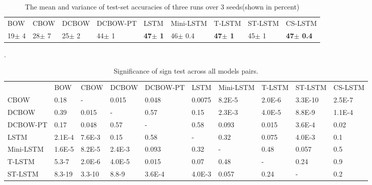 \begin{table*}[t]
    \centering
    \small
    \begin{tabular}{lllllllll}
    BOW  & CBOW & DCBOW & DCBOW-PT & LSTM & Mini-LSTM & T-LSTM & ST-LSTM &CS-LSTM \\
    19$\pm$ 4 & 28$\pm$ 7 & 25$\pm$ 2 & 44$\pm$ 1 & \textbf{47$\pm$ 1} & 46$\pm$ 0.4 & \textbf{47$\pm$ 1} & 45$\pm$ 1& \textbf{47$\pm$ 0.4}
    \end{tabular}
    \label{table: results-acc}
    \caption{The mean and variance of test-set accuracies of three runs over 3 seeds(shown in percent)}.
\end{table*}


\begin{table*}[t]
    \small
    \begin{tabular}{llllllllll}
                     & BOW     & CBOW     & DCBOW  & DCBOW-PT   & LSTM    &
                     Mini-LSTM & T-LSTM & ST-LSTM & CS-LSTM\\
        CBOW         & 0.18  &   -   & 0.015  & 0.048 &0.0075&8.2E-5 & 2.0E-6 &3.3E-10    & 2.5E-7\\
        DCBOW    & 0.39   &  0.015   &  -    &  0.57  & 0.15  & 2.3E-3  & 4.0E-5 & 8.8E-9     & 1.1E-4 \\
        DCBOW-PT & 0.17  &   0.048  &   0.57  &   -  &  0.58 &  0.093  &   0.015  & 3.6E-4 & 0.02 \\
        LSTM         & 2.1E-4 &  7.6E-3 &  0.15  &  0.58 & -  &  0.32  &  0.075  & 4.0E-3    &0.1  \\
        Mini-LSTM    & 1.6E-5 &  8.2E-5 &  2.4E-3  &  0.093  &  0.32  &   -    &    0.48   &  0.057  & 0.5   \\
        T-LSTM    & 5.3-7  & 2.0E-6 & 4.0E-5 &  0.015  & 0.07  &   0.48   &    -    &   0.24    &0.9 \\
        ST-LSTM & 8.3-19  &  3.3-10  &  8.8-9  & 3.6E-4 & 4.0E-3 &  0.057   &    0.24   &   -     & 0.2  
        \end{tabular}
    \label{table: sign}
    \caption{Significance of sign test across all models pairs.}
\end{table*}